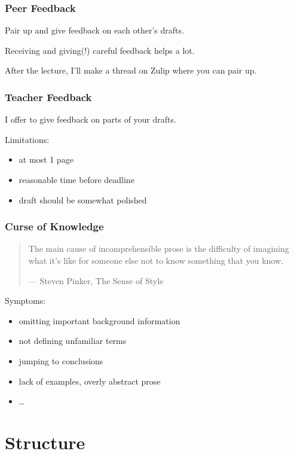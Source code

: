 \documentclass[xetex]{beamer}
\begin{document}
\begin{frame}
  \frametitle{Peer Feedback}

  Pair up and give feedback on each other's drafts.

  \medskip
  \pause

  Receiving and giving(!) careful feedback helps a lot.

  \medskip
  \pause

  After the lecture, I'll make a thread on Zulip where you can pair up.
\end{frame}

\begin{frame}
  \frametitle{Teacher Feedback}

  I offer to give feedback on parts of your drafts.

  \medskip
  \pause

  Limitations:
  \begin{itemize}
    \item at most 1 page
    \item reasonable time before deadline
    \item draft should be somewhat polished
  \end{itemize}
\end{frame}

\begin{frame}
  \frametitle{Curse of Knowledge}

  \begin{quote}
    The main cause of incomprehensible prose is the difficulty of imagining what it's like for someone else not to know something that you know.

    --- Steven Pinker, The Sense of Style
  \end{quote}

  \pause
  \medskip

  Symptoms:
  \begin{itemize}[<+->]
    \item omitting important background information
    \item not defining unfamiliar terms
    \item jumping to conclusions
    \item lack of examples, overly abstract prose
    \item \dots
  \end{itemize}
\end{frame}

\section{Structure}
\end{document}
